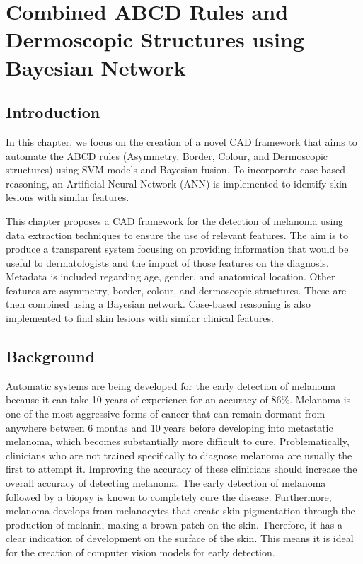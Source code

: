 \chapter{Combined ABCD Rules and Dermoscopic Structures using Bayesian Network}

\section{Introduction}
In this chapter, we focus on the creation of a novel CAD framework that aims to automate the ABCD rules (Asymmetry, Border, Colour, and Dermoscopic structures) using SVM models and Bayesian fusion. To incorporate case-based reasoning, an Artificial Neural Network (ANN) is implemented to identify skin lesions with similar features.

This chapter proposes a CAD framework for the detection of melanoma using data extraction techniques to ensure the use of relevant features. The aim is to produce a transparent system focusing on providing information that would be useful to dermatologists and the impact of those features on the diagnosis. Metadata is included regarding age, gender, and anatomical location. Other features are asymmetry, border, colour, and dermoscopic structures. These are then combined using a Bayesian network. Case-based reasoning is also implemented to find skin lesions with similar clinical features.

\section{Background}
Automatic systems are being developed for the early detection of melanoma because it can take 10 years of experience for an accuracy of 86\%\cite{Morton1998}. Melanoma is one of the most aggressive forms of cancer that can remain dormant from anywhere between 6 months and 10 years before developing into metastatic melanoma, which becomes substantially more difficult to cure\cite{UK2019}. Problematically, clinicians who are not trained specifically to diagnose melanoma are usually the first to attempt it. Improving the accuracy of these clinicians should increase the overall accuracy of detecting melanoma. The early detection of melanoma followed by a biopsy is known to completely cure the disease\cite{mohammadpour2019}. Furthermore, melanoma develops from melanocytes that create skin pigmentation through the production of melanin, making a brown patch on the skin. Therefore, it has a clear indication of development on the surface of the skin. This means it is ideal for the creation of computer vision models for early detection.

